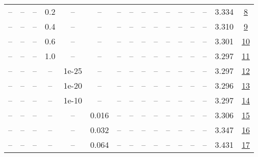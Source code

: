 \begin{table}[H]
\begin{tabular}{cccccccccccccccc}
-- & -- & -- & 0.2 & -- & -- & -- & -- & -- & -- & -- & -- & -- & -- & 3.334 & \href{https://wandb.ai/stanford-mercury/optimizer-scaling/runs/sweep-130m-10B-muonz92cf4alr0.008-wd0.1-minlr0-warmup0-b10.8-b20-bdd74a}{8} \\
-- & -- & -- & 0.4 & -- & -- & -- & -- & -- & -- & -- & -- & -- & -- & 3.310 & \href{https://wandb.ai/stanford-mercury/optimizer-scaling/runs/sweep-130m-10B-muonz252576lr0.008-wd0.1-minlr0-warmup0-b10.8-b20-5f8e54}{9} \\
-- & -- & -- & 0.6 & -- & -- & -- & -- & -- & -- & -- & -- & -- & -- & 3.301 & \href{https://wandb.ai/stanford-mercury/optimizer-scaling/runs/sweep-130m-10B-muonzcbcf0elr0.008-wd0.1-minlr0-warmup0-b10.8-b20-b3af8f}{10} \\
-- & -- & -- & 1.0 & -- & -- & -- & -- & -- & -- & -- & -- & -- & -- & 3.297 & \href{https://wandb.ai/stanford-mercury/optimizer-scaling/runs/sweep-130m-10B-muonze94b59lr0.008-wd0.1-minlr0-warmup0-b10.8-b20-fee6f0}{11} \\
-- & -- & -- & -- & 1e-25 & -- & -- & -- & -- & -- & -- & -- & -- & -- & 3.297 & \href{https://wandb.ai/stanford-mercury/optimizer-scaling/runs/sweep-130m-10B-muonz9a14ablr0.008-wd0.1-minlr0-warmup0-b10.8-b20-219e6f}{12} \\
-- & -- & -- & -- & 1e-20 & -- & -- & -- & -- & -- & -- & -- & -- & -- & 3.296 & \href{https://wandb.ai/stanford-mercury/optimizer-scaling/runs/sweep-130m-10B-muonz32b0f9lr0.008-wd0.1-minlr0-warmup0-b10.8-b20-c69265}{13} \\
-- & -- & -- & -- & 1e-10 & -- & -- & -- & -- & -- & -- & -- & -- & -- & 3.297 & \href{https://wandb.ai/stanford-mercury/optimizer-scaling/runs/sweep-130m-10B-muonz0cc0c3lr0.008-wd0.1-minlr0-warmup0-b10.8-b20-afc344}{14} \\
-- & -- & -- & -- & -- & 0.016 & -- & -- & -- & -- & -- & -- & -- & -- & 3.306 & \href{https://wandb.ai/stanford-mercury/optimizer-scaling/runs/sweep-130m-10B-muonz04e7d1lr0.016-wd0.1-minlr0-warmup0-b10.8-b20-0bfb9c}{15} \\
-- & -- & -- & -- & -- & 0.032 & -- & -- & -- & -- & -- & -- & -- & -- & 3.347 & \href{https://wandb.ai/stanford-mercury/optimizer-scaling/runs/sweep-130m-10B-muonz305b82lr0.032-wd0.1-minlr0-warmup0-b10.8-b20-c13c8a}{16} \\
-- & -- & -- & -- & -- & 0.064 & -- & -- & -- & -- & -- & -- & -- & -- & 3.431 & \href{https://wandb.ai/stanford-mercury/optimizer-scaling/runs/sweep-130m-10B-muonj4c9af2lr0.064-wd0.1-minlr0-warmup0-b10.8-b20-a5a6e2}{17} \\

\end{tabular}
\end{table}
